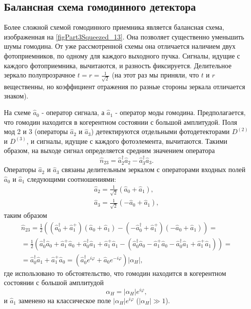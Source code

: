 

\subsection{Балансная схема гомодинного детектора}
Более сложной схемой гомодинного приемника является балансная схема,
изображенная на \autoref{figPart3Squeezed_13}. Она позволяет
существенно уменьшить шумы гомодина. От уже рассмотренной схемы она
отличается наличием двух фотоприемников, по одному для каждого
выходного пучка. Сигналы, идущие с каждого фотоприемника, вычитаются, и
разность фиксируется. Делительное зеркало полупрозрачное $t = r =
\frac{1}{\sqrt{2}}$ (на этот раз мы приняли, что $t$ и $r$
вещественны, но коэффициент отражения по разные стороны зеркала
отличается знаком).

На схеме $\hat{a}_0$ - оператор сигнала, а $\hat{a}_1$ - оператор моды
гомодина. Предполагается, что гомодин находится в когерентном
состоянии с большой амплитудой. Поля мод 2 и 3 (операторы $\hat{a}_2$
и $\hat{a}_3$) детектируются отдельными фотодетекторами $D^{(2)}$ и
$D^{(3)}$, и сигналы, идущие с каждого фотоэлемента, вычитаются. Такими
образом, на выходе сигнал определяется средним значением оператора
\begin{equation}
\hat{n}_{23} = \hat{a}_2^{\dag}\hat{a}_2 - 
\hat{a}_3^{\dag}\hat{a}_3.
\nonumber
\end{equation}
Операторы $\hat{a}_2$ и $\hat{a}_3$ связаны  делительным зеркалом с
операторами входных полей $\hat{a}_0$ и $\hat{a}_1$ следующими
соотношениями: 
\begin{eqnarray}
\hat{a}_2 = \frac{1}{\sqrt{2}} \left(\hat{a}_0 + \hat{a}_1\right),
\nonumber \\
\hat{a}_3 = \frac{1}{\sqrt{2}} \left(- \hat{a}_0 + \hat{a}_1\right),
\nonumber
\end{eqnarray}
таким образом
\begin{eqnarray}
\hat{n}_{23} = \frac{1}{2}
\left(
\left(\hat{a}_0^{\dag} + \hat{a}_1^{+}\right)
\left(\hat{a}_0 + \hat{a}_1\right)
-
\left(-\hat{a}_0^{\dag} + \hat{a}_1^{+}\right)
\left(-\hat{a}_0 + \hat{a}_1\right)
\right) = 
\nonumber \\
=
\frac{1}{2}
\left(
\hat{a}_0^{\dag}\hat{a}_0 + \hat{a}_1^{+}\hat{a}_0
+
\hat{a}_0^{\dag}\hat{a}_1 + \hat{a}_1^{+}\hat{a}_1
-
\left(
\hat{a}_0^{\dag}\hat{a}_0 - \hat{a}_1^{+}\hat{a}_0
-\hat{a}_0^{\dag}\hat{a}_1 + \hat{a}_1^{+}\hat{a}_1
\right)
\right) = 
\nonumber \\
=\hat{a}_0^{\dag}\hat{a}_1 + \hat{a}_1^{+}\hat{a}_0 = 
\left(
\hat{a}_0^{\dag}e^{i\varphi} + \hat{a}_0 e^{- i\varphi}
\right)\left|\alpha_H\right|,
\nonumber
\end{eqnarray}
где использовано то обстоятельство, что гомодин находится в
когерентном состоянии с большой амплитудой 
\[
\alpha_H = \left|\alpha_H\right|e^{i\varphi},
\]
и $\hat{a}_1$ заменено на классическое поле
$\left|\alpha_H\right|e^{i\varphi}$ ($\left|\alpha_H\right| \gg 1$).  

